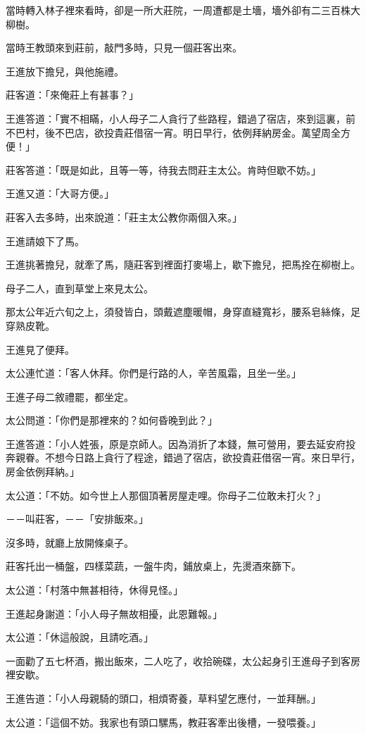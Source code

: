 \documentclass[11pt,a4paper]{article}
\begin{document}
當時轉入林子裡來看時，卻是一所大莊院，一周遭都是土墻，墻外卻有二三百株大柳樹。

當時王教頭來到莊前，敲門多時，只見一個莊客出來。

王進放下擔兒，與他施禮。

莊客道：「來俺莊上有甚事？」

王進答道：「實不相瞞，小人母子二人貪行了些路程，錯過了宿店，來到這裏，前不巴村，後不巴店，欲投貴莊借宿一宵。明日早行，依例拜納房金。萬望周全方便！」

莊客答道：「既是如此，且等一等，待我去問莊主太公。肯時但歇不妨。」

王進又道：「大哥方便。」

莊客入去多時，出來說道：「莊主太公教你兩個入來。」

王進請娘下了馬。

王進挑著擔兒，就牽了馬，隨莊客到裡面打麥場上，歇下擔兒，把馬拴在柳樹上。

母子二人，直到草堂上來見太公。

那太公年近六旬之上，須發皆白，頭戴遮塵暖帽，身穿直縫寬衫，腰系皂絲條，足穿熟皮靴。

王進見了便拜。

太公連忙道：「客人休拜。你們是行路的人，辛苦風霜，且坐一坐。」

王進子母二敘禮罷，都坐定。

太公問道：「你們是那裡來的？如何昏晚到此？」

王進答道：「小人姓張，原是京師人。因為消折了本錢，無可營用，要去延安府投奔親眷。不想今日路上貪行了程途，錯過了宿店，欲投貴莊借宿一宵。來日早行，房金依例拜納。」

太公道：「不妨。如今世上人那個頂著房屋走哩。你母子二位敢未打火？」

－－叫莊客，－－「安排飯來。」

沒多時，就廳上放開條桌子。

莊客托出一桶盤，四樣菜蔬，一盤牛肉，鋪放桌上，先燙酒來篩下。

太公道：「村落中無甚相待，休得見怪。」

王進起身謝道：「小人母子無故相擾，此恩難報。」

太公道：「休這般說，且請吃酒。」

一面勸了五七杯酒，搬出飯來，二人吃了，收拾碗碟，太公起身引王進母子到客房裡安歇。

王進告道：「小人母親騎的頭口，相煩寄養，草料望乞應付，一並拜酬。」

太公道：「這個不妨。我家也有頭口騾馬，教莊客牽出後槽，一發喂養。」
\end{document}
